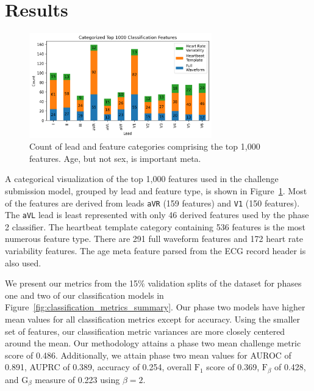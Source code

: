 \documentclass[twocolumn]{cinc}
\begin{document}
\section{Results}

\begin{figure}[ht]
  \centering
  \includegraphics[width=7.9cm]{fig/top_features_bar.png}
  \caption{Count of lead and feature categories comprising the top 1,000 features. Age, but not sex, is important meta.}
  \label{fig:top_features}
\end{figure}

A categorical visualization of the top 1,000 features used in the challenge submission model, grouped by lead and feature type, is shown in Figure~\ref{fig:top_features}.
Most of the features are derived from leads \texttt{aVR} (159 features) and \texttt{V1} (150 features).
The \texttt{aVL} lead is least represented with only 46 derived features used by the phase 2 classifier.
The heartbeat template category containing 536 features is the most numerous feature type.
There are 291 full waveform features and 172 heart rate variability features.
The age meta feature parsed from the ECG record header is also used.

We present our metrics from the 15\% validation splits of the dataset for phases one and two of our classification models in Figure~\ref{fig:classification_metrics_summary}.
Our phase two models have higher mean values for all classification metrics except for accuracy.
Using the smaller set of features, our classification metric variances are more closely centered around the mean.
Our methodology attains a phase two mean challenge metric score of 0.486.
Additionally, we attain phase two mean values for AUROC of 0.891, AUPRC of 0.389, accuracy of 0.254, overall $\text{F}_1$ score of 0.369, $\text{F}_\beta$ of 0.428, and $\text{G}_\beta$ measure of 0.223 using $\beta = 2$.
\end{document}
